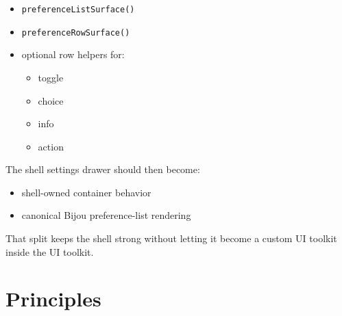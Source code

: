 \begin{itemize}
\tightlist
\item
  \texttt{p\allowbreak{}r\allowbreak{}e\allowbreak{}f\allowbreak{}e\allowbreak{}r\allowbreak{}e\allowbreak{}n\allowbreak{}c\allowbreak{}e\allowbreak{}L\allowbreak{}i\allowbreak{}s\allowbreak{}t\allowbreak{}S\allowbreak{}u\allowbreak{}r\allowbreak{}f\allowbreak{}a\allowbreak{}c\allowbreak{}e\allowbreak{}(\allowbreak{})}
\item
  \texttt{p\allowbreak{}r\allowbreak{}e\allowbreak{}f\allowbreak{}e\allowbreak{}r\allowbreak{}e\allowbreak{}n\allowbreak{}c\allowbreak{}e\allowbreak{}R\allowbreak{}o\allowbreak{}w\allowbreak{}S\allowbreak{}u\allowbreak{}r\allowbreak{}f\allowbreak{}a\allowbreak{}c\allowbreak{}e\allowbreak{}(\allowbreak{})}
\item
  optional row helpers for:

  \begin{itemize}
  \tightlist
  \item
    toggle
  \item
    choice
  \item
    info
  \item
    action
  \end{itemize}
\end{itemize}

The shell settings drawer should then become:

\begin{itemize}
\tightlist
\item
  shell-owned container behavior
\item
  canonical Bijou preference-list rendering
\end{itemize}

That split keeps the shell strong without letting it become a custom UI toolkit inside the UI toolkit.

\section{Principles}\label{record-054-principles}


